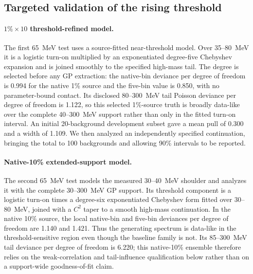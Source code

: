 \subsection{Targeted validation of the rising threshold}
\label{sec:v491-threshold-validation}

\paragraph{$1\%\times10$ threshold-refined model.}
The first 65~MeV test uses a source-fitted near-threshold model. Over 35--80~MeV it is a logistic turn-on multiplied by an exponentiated
degree-five Chebyshev expansion and is joined smoothly to the specified high-mass tail.
The degree is selected before any GP extraction: the native-bin deviance per degree of
freedom is 0.994 for the native 1\% source and the five-bin value is 0.850, with no
parameter-bound contact.  Its disclosed 80--300~MeV tail Poisson deviance per degree
of freedom is 1.122, so this selected 1\%-source truth is broadly data-like over the
complete 40--300~MeV support rather than only in the fitted turn-on interval. An
initial 20-background development subset gave a mean pull of 0.300 and a width of
1.109. We then analyzed an independently specified continuation, bringing the total to
100 backgrounds and allowing 90\% intervals to be reported.

\paragraph{Native-10\% extended-support model.}
The second 65~MeV test models the measured 30--40~MeV shoulder and analyzes it with
the complete 30--300~MeV GP support.  Its threshold component is a logistic turn-on
times a degree-six exponentiated Chebyshev form fitted over 30--80~MeV, joined with a
$C^2$ taper to a smooth high-mass continuation. In the native 10\% source, the local
native-bin and five-bin deviances per degree of freedom are 1.140 and 1.421.  Thus the
generating spectrum is data-like in the threshold-sensitive region even though the
baseline family is not. Its 85--300~MeV tail deviance per degree of freedom
is 6.220; this native-10\% ensemble therefore relies on the weak-correlation and
tail-influence qualification below rather than on a support-wide goodness-of-fit
claim.


